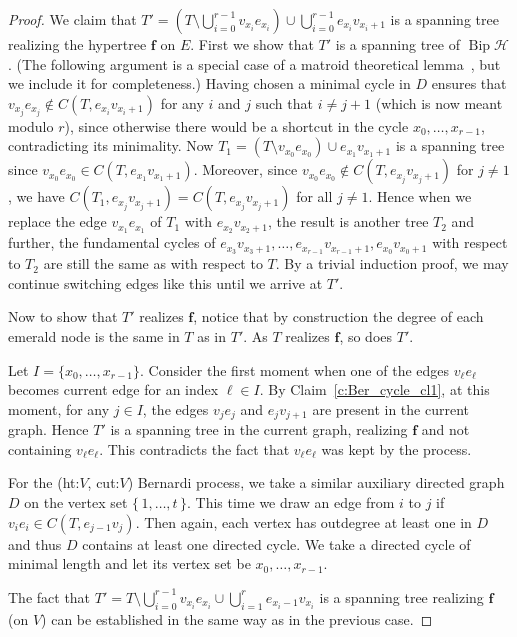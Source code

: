 \documentclass[ALCO,ThmDefs,Unicode,epreuves]{cedram}
\newcommand{\HH}{\mathcal H}
\DeclareMathOperator{\bip}{Bip}
\begin{document}
\begin{proof}
We claim that $T'=\left(T\setminus\bigcup_{i=0}^{r-1} v_{x_i}e_{x_i}\right)\cup \bigcup_{i=0}^{r-1}e_{x_i}v_{x_i+1}$ is a spanning tree realizing the hypertree $\mathbf f$ on $E$. First we show that $T'$ is a spanning tree of $\bip \HH$. (The following argument is a special case of a matroid theoretical lemma~\cite[Theorem~39.13]{Schrijver_CombOpt}, but we include it for completeness.) Having chosen a minimal cycle in $D$ ensures that $v_{x_j}e_{x_j}\notin C(T,e_{x_i}v_{x_i+1})$ for any $i$ and $j$ such that $i\neq j+1$ (which is now meant modulo $r$), since otherwise there would be a shortcut in the cycle $x_0,\dots,x_{r-1}$, contradicting its minimality. Now $T_1=(T\setminus v_{x_0}e_{x_0})\cup e_{x_1}v_{x_1+1}$ is a spanning tree since $v_{x_0}e_{x_0}\in C(T,e_{x_1}v_{x_1+1})$. Moreover, since $v_{x_0}e_{x_0}\notin C(T,e_{x_j}v_{x_j+1})$ for $j\neq 1$, we have $C(T_1,e_{x_j}v_{x_j+1})=C(T,e_{x_j}v_{x_j+1})$ for all $j\neq 1$. Hence when we replace the edge $v_{x_1}e_{x_1}$ of $T_1$ with $e_{x_2}v_{x_2+1}$, the result is another tree $T_2$ and further, the fundamental cycles of $e_{x_3}v_{x_3+1},\ldots,e_{x_{r-1}}v_{x_{r-1}+1},e_{x_0}v_{x_0+1}$ with respect to $T_2$ are still the same as with respect to $T$. By a trivial induction proof, we may continue switching edges like this until we arrive at $T'$.

Now to show that $T'$ realizes $\mathbf f$, notice that by construction the degree of each emerald node is the same in $T$ as in $T'$. As $T$ realizes $\mathbf f$, so does $T'$.

Let $I=\{x_0,\dots,x_{r-1}\}$. Consider the first moment when one of the edges $v_\ell e_\ell$ becomes current edge for an index $\ell\in I$. By Claim~\ref{c:Ber_cycle_cl1}, at this moment, for any $j\in I$, the edges $v_j e_j$ and $e_j v_{j+1}$ are present in the current graph. Hence $T'$ is a spanning tree in the current graph, realizing $\mathbf f$ and not containing $v_\ell e_\ell$. This contradicts the fact that $v_\ell e_\ell$ was kept by the process.

For the (ht:$V$, cut:$V$) Bernardi process, we take a similar auxiliary directed graph~$D$ on the vertex set $\{\,1,\dots,t\,\}$. This time we draw an edge from $i$ to $j$ if $v_{i}e_{i}\in C(T,e_{j-1}v_j)$. Then again, each vertex has outdegree at least one in $D$ and thus $D$ contains at least one directed cycle. We take a directed cycle of minimal length and let its vertex set be $x_0,\dots,x_{r-1}$.

The fact that $T'=T\setminus\bigcup_{i=0}^{r-1} v_{x_i}e_{x_i}\cup \bigcup_{i=1}^{r}e_{x_i-1}v_{x_i}$ is a spanning tree realizing $\mathbf f$ (on $V$) can be established in the same way as in the previous case. 


\end{proof}
\end{document}
